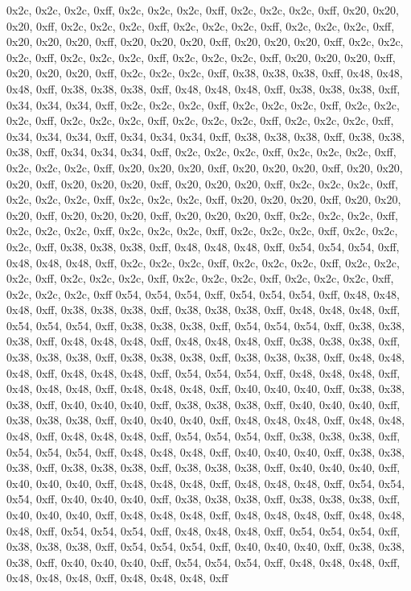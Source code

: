 0x2c, 0x2c, 0x2c, 0xff, 0x2c, 0x2c, 0x2c, 0xff, 0x2c, 0x2c, 0x2c, 0xff, 0x20, 0x20, 0x20, 0xff, 0x2c, 0x2c, 0x2c, 0xff, 0x2c, 0x2c, 0x2c, 0xff, 0x2c, 0x2c, 0x2c, 0xff, 0x20, 0x20, 0x20, 0xff, 0x20, 0x20, 0x20, 0xff, 0x20, 0x20, 0x20, 0xff, 0x2c, 0x2c, 0x2c, 0xff, 0x2c, 0x2c, 0x2c, 0xff, 0x2c, 0x2c, 0x2c, 0xff, 0x20, 0x20, 0x20, 0xff, 0x20, 0x20, 0x20, 0xff, 0x2c, 0x2c, 0x2c, 0xff, 0x38, 0x38, 0x38, 0xff, 0x48, 0x48, 0x48, 0xff, 0x38, 0x38, 0x38, 0xff, 0x48, 0x48, 0x48, 0xff, 0x38, 0x38, 0x38, 0xff, 0x34, 0x34, 0x34, 0xff, 0x2c, 0x2c, 0x2c, 0xff, 0x2c, 0x2c, 0x2c, 0xff, 0x2c, 0x2c, 0x2c, 0xff, 0x2c, 0x2c, 0x2c, 0xff, 0x2c, 0x2c, 0x2c, 0xff, 0x2c, 0x2c, 0x2c, 0xff, 0x34, 0x34, 0x34, 0xff, 0x34, 0x34, 0x34, 0xff, 0x38, 0x38, 0x38, 0xff, 0x38, 0x38, 0x38, 0xff, 0x34, 0x34, 0x34, 0xff, 0x2c, 0x2c, 0x2c, 0xff, 0x2c, 0x2c, 0x2c, 0xff, 0x2c, 0x2c, 0x2c, 0xff, 0x20, 0x20, 0x20, 0xff, 0x20, 0x20, 0x20, 0xff, 0x20, 0x20, 0x20, 0xff, 0x20, 0x20, 0x20, 0xff, 0x20, 0x20, 0x20, 0xff, 0x2c, 0x2c, 0x2c, 0xff, 0x2c, 0x2c, 0x2c, 0xff, 0x2c, 0x2c, 0x2c, 0xff, 0x20, 0x20, 0x20, 0xff, 0x20, 0x20, 0x20, 0xff, 0x20, 0x20, 0x20, 0xff, 0x20, 0x20, 0x20, 0xff, 0x2c, 0x2c, 0x2c, 0xff, 0x2c, 0x2c, 0x2c, 0xff, 0x2c, 0x2c, 0x2c, 0xff, 0x2c, 0x2c, 0x2c, 0xff, 0x2c, 0x2c, 0x2c, 0xff, 0x38, 0x38, 0x38, 0xff, 0x48, 0x48, 0x48, 0xff, 0x54, 0x54, 0x54, 0xff, 0x48, 0x48, 0x48, 0xff, 0x2c, 0x2c, 0x2c, 0xff, 0x2c, 0x2c, 0x2c, 0xff, 0x2c, 0x2c, 0x2c, 0xff, 0x2c, 0x2c, 0x2c, 0xff, 0x2c, 0x2c, 0x2c, 0xff, 0x2c, 0x2c, 0x2c, 0xff, 0x2c, 0x2c, 0x2c, 0xff
0x54, 0x54, 0x54, 0xff, 0x54, 0x54, 0x54, 0xff, 0x48, 0x48, 0x48, 0xff, 0x38, 0x38, 0x38, 0xff, 0x38, 0x38, 0x38, 0xff, 0x48, 0x48, 0x48, 0xff, 0x54, 0x54, 0x54, 0xff, 0x38, 0x38, 0x38, 0xff, 0x54, 0x54, 0x54, 0xff, 0x38, 0x38, 0x38, 0xff, 0x48, 0x48, 0x48, 0xff, 0x48, 0x48, 0x48, 0xff, 0x38, 0x38, 0x38, 0xff, 0x38, 0x38, 0x38, 0xff, 0x38, 0x38, 0x38, 0xff, 0x38, 0x38, 0x38, 0xff, 0x48, 0x48, 0x48, 0xff, 0x48, 0x48, 0x48, 0xff, 0x54, 0x54, 0x54, 0xff, 0x48, 0x48, 0x48, 0xff, 0x48, 0x48, 0x48, 0xff, 0x48, 0x48, 0x48, 0xff, 0x40, 0x40, 0x40, 0xff, 0x38, 0x38, 0x38, 0xff, 0x40, 0x40, 0x40, 0xff, 0x38, 0x38, 0x38, 0xff, 0x40, 0x40, 0x40, 0xff, 0x38, 0x38, 0x38, 0xff, 0x40, 0x40, 0x40, 0xff, 0x48, 0x48, 0x48, 0xff, 0x48, 0x48, 0x48, 0xff, 0x48, 0x48, 0x48, 0xff, 0x54, 0x54, 0x54, 0xff, 0x38, 0x38, 0x38, 0xff, 0x54, 0x54, 0x54, 0xff, 0x48, 0x48, 0x48, 0xff, 0x40, 0x40, 0x40, 0xff, 0x38, 0x38, 0x38, 0xff, 0x38, 0x38, 0x38, 0xff, 0x38, 0x38, 0x38, 0xff, 0x40, 0x40, 0x40, 0xff, 0x40, 0x40, 0x40, 0xff, 0x48, 0x48, 0x48, 0xff, 0x48, 0x48, 0x48, 0xff, 0x54, 0x54, 0x54, 0xff, 0x40, 0x40, 0x40, 0xff, 0x38, 0x38, 0x38, 0xff, 0x38, 0x38, 0x38, 0xff, 0x40, 0x40, 0x40, 0xff, 0x48, 0x48, 0x48, 0xff, 0x48, 0x48, 0x48, 0xff, 0x48, 0x48, 0x48, 0xff, 0x54, 0x54, 0x54, 0xff, 0x48, 0x48, 0x48, 0xff, 0x54, 0x54, 0x54, 0xff, 0x38, 0x38, 0x38, 0xff, 0x54, 0x54, 0x54, 0xff, 0x40, 0x40, 0x40, 0xff, 0x38, 0x38, 0x38, 0xff, 0x40, 0x40, 0x40, 0xff, 0x54, 0x54, 0x54, 0xff, 0x48, 0x48, 0x48, 0xff, 0x48, 0x48, 0x48, 0xff, 0x48, 0x48, 0x48, 0xff
